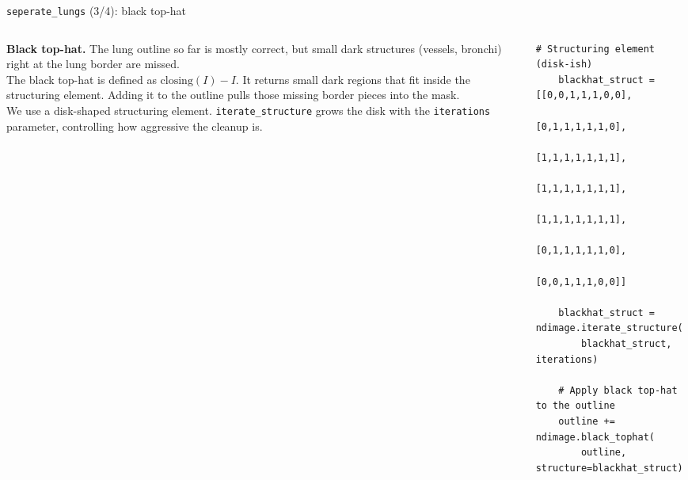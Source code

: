 \documentclass[10pt,aspectratio=169]{beamer}
\begin{document}
\begin{frame}[fragile]{\texttt{seperate\_lungs} (3/4): black top-hat}
\begin{columns}[T,onlytextwidth]
\begin{column}{0.42\textwidth}
\small
\textbf{Black top-hat.} The lung outline so far is mostly correct, but small dark structures (vessels, bronchi) right at the lung border are missed.\\[0.4em]
The black top-hat is defined as $\text{closing}(I) - I$. It returns small dark regions that fit inside the structuring element. Adding it to the outline pulls those missing border pieces into the mask.\\[0.4em]
We use a disk-shaped structuring element. \texttt{iterate\_structure} grows the disk with the \texttt{iterations} parameter, controlling how aggressive the cleanup is.
\end{column}
\begin{column}{0.56\textwidth}
\begin{lstlisting}[firstnumber=last]
    # Structuring element (disk-ish)
    blackhat_struct = [[0,0,1,1,1,0,0],
                       [0,1,1,1,1,1,0],
                       [1,1,1,1,1,1,1],
                       [1,1,1,1,1,1,1],
                       [1,1,1,1,1,1,1],
                       [0,1,1,1,1,1,0],
                       [0,0,1,1,1,0,0]]

    blackhat_struct = ndimage.iterate_structure(
        blackhat_struct, iterations)

    # Apply black top-hat to the outline
    outline += ndimage.black_tophat(
        outline, structure=blackhat_struct)
\end{lstlisting}
\end{column}
\end{columns}
\end{frame}
\end{document}
